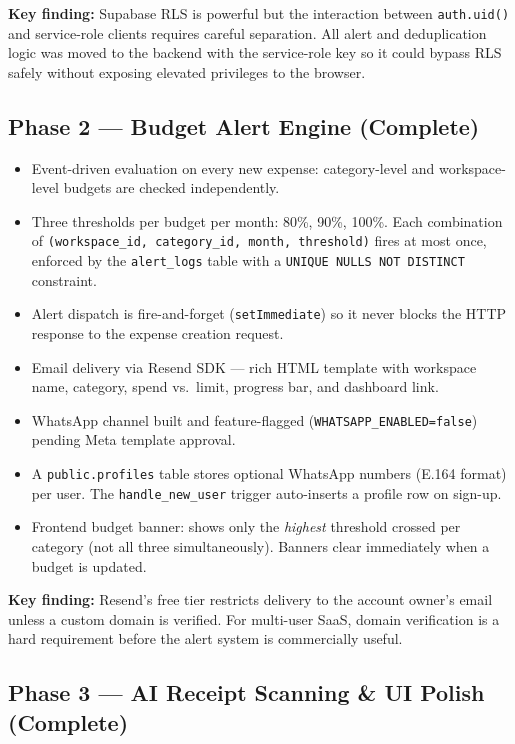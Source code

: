 \documentclass[11pt,a4paper]{article}
\begin{document}
\textbf{Key finding:} Supabase RLS is powerful but the interaction between
\texttt{auth.uid()} and service-role clients requires careful separation. All
alert and deduplication logic was moved to the backend with the service-role key
so it could bypass RLS safely without exposing elevated privileges to the
browser.

\subsection*{Phase 2 — Budget Alert Engine \textnormal{\small\color{phasegreen}(Complete)}}

\begin{itemize}[leftmargin=1.2cm]
  \item Event-driven evaluation on every new expense: category-level and
        workspace-level budgets are checked independently.
  \item Three thresholds per budget per month: 80\%, 90\%, 100\%.
        Each combination of \texttt{(workspace\_id, category\_id, month, threshold)}
        fires at most once, enforced by the \texttt{alert\_logs} table with a
        \texttt{UNIQUE NULLS NOT DISTINCT} constraint.
  \item Alert dispatch is fire-and-forget (\texttt{setImmediate}) so it never
        blocks the HTTP response to the expense creation request.
  \item Email delivery via Resend SDK — rich HTML template with workspace name,
        category, spend vs.\ limit, progress bar, and dashboard link.
  \item WhatsApp channel built and feature-flagged
        (\texttt{WHATSAPP\_ENABLED=false}) pending Meta template approval.
  \item A \texttt{public.profiles} table stores optional WhatsApp numbers
        (E.164 format) per user. The \texttt{handle\_new\_user} trigger
        auto-inserts a profile row on sign-up.
  \item Frontend budget banner: shows only the \emph{highest} threshold crossed
        per category (not all three simultaneously). Banners clear immediately
        when a budget is updated.
\end{itemize}

\textbf{Key finding:} Resend's free tier restricts delivery to the account
owner's email unless a custom domain is verified. For multi-user SaaS, domain
verification is a hard requirement before the alert system is commercially
useful.

\subsection*{Phase 3 — AI Receipt Scanning \& UI Polish \textnormal{\small\color{phasegreen}(Complete)}}
\end{document}

